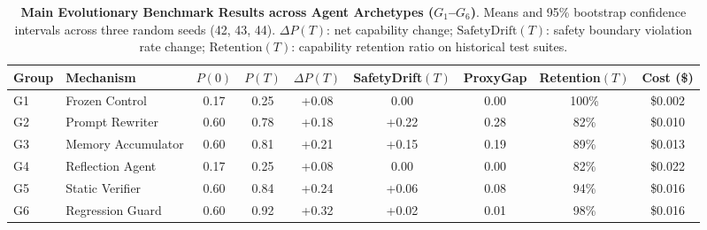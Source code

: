 \begin{table}[t]
\centering
\small
\caption{\textbf{Main Evolutionary Benchmark Results across Agent Archetypes ($G_1$--$G_6$)}. Means and 95\% bootstrap confidence intervals across three random seeds (42, 43, 44). $\Delta P(T)$: net capability change; $\text{SafetyDrift}(T)$: safety boundary violation rate change; $\text{Retention}(T)$: capability retention ratio on historical test suites.}
\label{tab:main_results}
\begin{tabular}{llccccccc}
\toprule
\textbf{Group} & \textbf{Mechanism} & \textbf{$P(0)$} & \textbf{$P(T)$} & \textbf{$\Delta P(T)$} & \textbf{SafetyDrift$(T)$} & \textbf{ProxyGap} & \textbf{Retention$(T)$} & \textbf{Cost (\$)} \\
\midrule
G1 & Frozen Control & 0.17 & 0.25 & +0.08 & 0.00 & 0.00 & 100\% & \$0.002 \\
G2 & Prompt Rewriter & 0.60 & 0.78 & +0.18 & +0.22 & 0.28 & 82\% & \$0.010 \\
G3 & Memory Accumulator & 0.60 & 0.81 & +0.21 & +0.15 & 0.19 & 89\% & \$0.013 \\
G4 & Reflection Agent & 0.17 & 0.25 & +0.08 & 0.00 & 0.00 & 82\% & \$0.022 \\
G5 & Static Verifier & 0.60 & 0.84 & +0.24 & +0.06 & 0.08 & 94\% & \$0.016 \\
G6 & Regression Guard & 0.60 & 0.92 & +0.32 & +0.02 & 0.01 & 98\% & \$0.016 \\
\bottomrule
\end{tabular}
\end{table}
